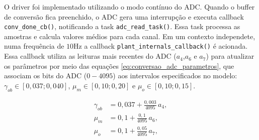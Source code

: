 O driver foi implementado utilizando o modo contínuo do ADC. Quando o buffer de conversão fica preenchido, o ADC gera uma interrupção e executa callback \texttt{conv\_done\_cb()}, notificando a task \texttt{adc\_read\_task()}. Essa task processa as amostras e calcula valores médios para cada canal. Em um contexto independete, numa frequência de $10 \mathrm{Hz}$ a callback \texttt{plant\_internals\_callback()} é acionada. Essa callback utiliza as leituras mais recentes do ADC ($a_4$,$a_6$ e $a_7$) para atualizar os parâmetros por meio das equações \eqref{eq:conversao_adc_parametros}, que associam os bits do ADC ($0 - 4095$) aos intervalos especificados no modelo: $\gamma_{ob}\in[0,037;0,040]$, $\mu_m\in[0,10;0,20]$ e $\mu_o\in[0,10;0,15]$.

\begin{equation}
    \begin{aligned}
        \gamma_{ob} &= 0,037 + \frac{0,003}{4095}\,a_4,\\
        \mu_m &= 0,1 + \frac{0,1}{4095}\,a_6,\\
        \mu_o &= 0,1 + \frac{0,05}{4095}\,a_7,
    \end{aligned}
    \label{eq:conversao_adc_parametros}
\end{equation}

\newpage
